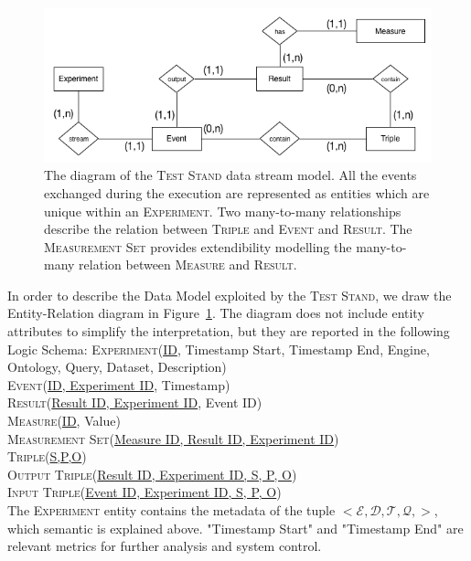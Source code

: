 \begin{figure}[t!bh]
  \centering
	\includegraphics[width=\linewidth]{images/er-db}
	\caption[\textsc{Test Stand} Data Stream ER-Diagram]{The diagram of the \textsc{Test Stand} data stream model. All the events exchanged during the execution are represented as entities which are unique within an \textsc{Experiment}. Two many-to-many relationships describe the relation between \textsc{Triple} and \textsc{Event} and \textsc{Result}. The \textsc{Measurement Set} provides extendibility modelling the many-to-many relation between \textsc{Measure} and \textsc{Result}.}
  	\label{fig:er}
\end{figure}

\noindent In order to describe the Data Model exploited by the \textsc{Test Stand}, we draw the Entity-Relation diagram in Figure~\ref{fig:er}. The diagram does not include entity attributes to simplify the interpretation, but they are reported in the following Logic Schema:
\noindent\textsc{Experiment}(\underline{ID}, Timestamp Start, Timestamp End, Engine, Ontology, Query, Dataset, Description)\\
\textsc{Event}(\underline{ID, Experiment ID}, Timestamp)\\
\textsc{Result}(\underline{Result ID, Experiment ID}, Event ID)\\
\textsc{Measure}(\underline{ID}, Value)\\
\textsc{Measurement Set}(\underline{Measure ID, Result ID, Experiment ID})\\
\textsc{Triple}(\underline{S,P,O})\\
\textsc{Output Triple}(\underline{Result ID, Experiment ID, S, P, O})\\
\textsc{Input Triple}(\underline{Event ID, Experiment ID, S, P, O})\\

The \textsc{Experiment} entity contains the metadata of the tuple $<\mathcal{E},\mathcal{D},\mathcal{T},\mathcal{Q},>$, which semantic is explained above. "Timestamp Start" and "Timestamp End" are relevant metrics for further analysis and system control. 

